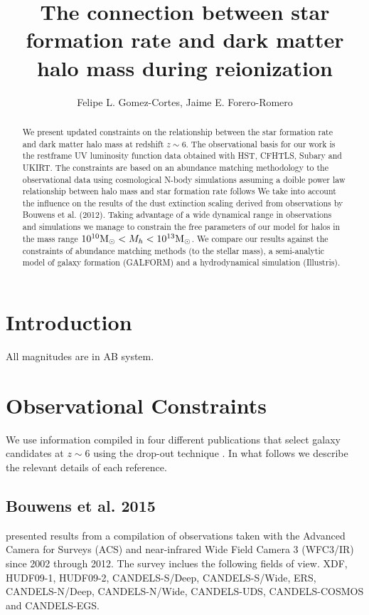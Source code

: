 \documentclass{emulateapj}
\newcommand{\Msun}{{\ifmmode{{\rm {M_{\odot}}}}\else{${\rm{M_{\odot}}}$}\fi}}
\begin{document}
\title{The connection between star formation rate and dark matter halo
  mass during reionization}


\author{Felipe L. Gomez-Cortes, Jaime E. Forero-Romero}  

\begin{abstract}
We present updated constraints on the relationship between the star
formation rate and dark matter halo mass at redshift $z\sim 6$.
The observational basis for our work is the restframe UV luminosity
function data obtained with HST, CFHTLS, Subary and UKIRT.
The constraints are based on an abundance matching methodology to the
observational data using cosmological N-body simulations assuming a
doible power law relationship between halo mass and star formation
rate follows
We take into account the influence on the results of the dust extinction
scaling derived from observations by Bouwens et al. (2012).
Taking advantage of a wide dynamical range in observations and
simulations we manage to constrain the free parameters of our model
for halos in the mass range $10^{10}\Msun < M_{h}<10^{13}\Msun$. 
We compare our results against the constraints of abundance matching
methods (to the stellar mass), a semi-analytic model of galaxy
formation (GALFORM) and a hydrodynamical simulation (Illustris).
\end{abstract}


\section{Introduction}
\label{sec:intro}


All magnitudes are in AB system.
\section{Observational Constraints}
\label{sec:theo}

We use information compiled in four different publications that select
galaxy candidates at $z\sim 6$ using the drop-out  technique
\citep{Steidel96}.   
In what follows we describe the relevant details of each reference.


\subsection{Bouwens et al. 2015}
\citet{Bouwens15} presented results from a compilation of
observations taken with the Advanced Camera for Surveys (ACS) and
near-infrared Wide Field Camera 3 (WFC3/IR) since 2002 through 2012. 
The survey inclues the following fields of view. XDF,
HUDF09-1, HUDF09-2, CANDELS-S/Deep,  CANDELS-S/Wide, ERS,
CANDELS-N/Deep, CANDELS-N/Wide, CANDELS-UDS,  CANDELS-COSMOS and
CANDELS-EGS.
\end{document}
